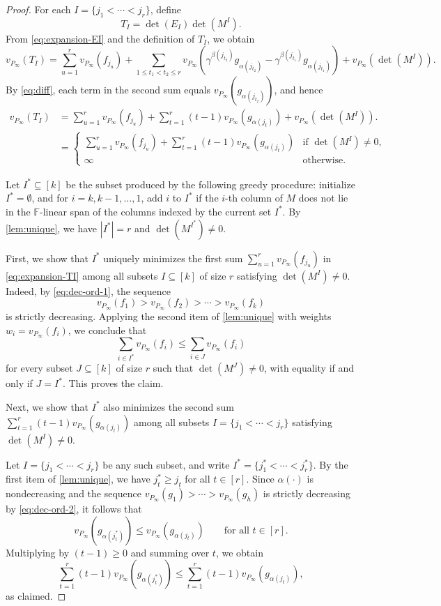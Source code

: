 \documentclass[10pt,a4paper]{amsart}
\newcommand{\F}{\mathbb{F}}
\begin{document}
\begin{proof}
\medskip
For each $I=\{j_1<\cdots<j_r\}$, define
\[
T_I=\det(E_I)\det(M^I).
\]
From \eqref{eq:expansion-EI} and the definition of $T_I$, we obtain
\[
v_{P_\infty}(T_I)
=
\sum_{u=1}^r v_{P_\infty}(f_{j_u})
+
\sum_{1\le t_1<t_2\le r}
v_{P_\infty}\!\left(
\gamma^{\beta(j_{t_2})} g_{\alpha(j_{t_2})}
-
\gamma^{\beta(j_{t_1})} g_{\alpha(j_{t_1})}
\right)
+
v_{P_\infty}(\det(M^I)).
\]
By \eqref{eq:diff}, each term in the second sum equals
$v_{P_\infty}(g_{\alpha(j_{t_2})})$, and hence
\begin{equation}\label{eq:expansion-TI}
\begin{aligned}
v_{P_\infty}(T_I)
&=
\sum_{u=1}^r v_{P_\infty}(f_{j_u})
+
\sum_{t=1}^r (t-1)v_{P_\infty}(g_{\alpha(j_t)})
+
v_{P_\infty}(\det(M^I)).\\
&=\begin{cases}
\sum_{u=1}^r v_{P_\infty}(f_{j_u})
+
\sum_{t=1}^r (t-1)v_{P_\infty}(g_{\alpha(j_t)}) & \text{if } \det(M^I)\neq 0,\\
\infty & \text{otherwise.}
\end{cases}
\end{aligned}
\end{equation}

Let $I^*\subseteq [k]$ be the subset produced by the following greedy procedure:
initialize $I^*=\emptyset$, and for $i=k,k-1,\dots,1$, add $i$ to $I^*$ if the $i$-th column of $M$ does not lie in the $\F$-linear span of the columns indexed by the current set $I^*$.
By \cref{lem:unique}, we have $|I^*|=r$ and $\det(M^{I^*})\neq 0$.

First, we show that $I^*$ uniquely minimizes
the first sum $\sum_{u=1}^r v_{P_\infty}(f_{j_u})$ in \eqref{eq:expansion-TI}
among all subsets $I\subseteq [k]$ of size $r$ satisfying $\det(M^I)\neq 0$.
Indeed, by \eqref{eq:dec-ord-1}, the sequence
\[
v_{P_\infty}(f_1) > v_{P_\infty}(f_2) > \cdots > v_{P_\infty}(f_k)
\]
is strictly decreasing. Applying the second item of \cref{lem:unique} with weights $w_i = v_{P_\infty}(f_i)$, we conclude that
\[
\sum_{i\in I^*} v_{P_\infty}(f_i)
\le \sum_{i\in J} v_{P_\infty}(f_i)
\]
for every subset $J\subseteq [k]$ of size $r$ such that $\det(M^J)\neq 0$, with equality if and only if $J=I^*$. This proves the claim.
 

Next, we show that $I^*$ also minimizes the second sum $\sum_{t=1}^r (t-1)v_{P_\infty}(g_{\alpha(j_t)})$
among all subsets $I=\{j_1<\cdots<j_r\}$ satisfying $\det(M^I)\neq 0$.

Let $I=\{j_1<\cdots<j_r\}$ be any such subset, and write $I^*=\{j_1^*<\cdots<j_r^*\}$.
By the first item of \cref{lem:unique}, we have $j_t^*\ge j_t$ for all $t\in [r]$.
Since $\alpha(\cdot)$ is nondecreasing and the sequence
$v_{P_\infty}(g_1) > \cdots > v_{P_\infty}(g_h)$
is strictly decreasing by \eqref{eq:dec-ord-2}, it follows that
\[
v_{P_\infty}(g_{\alpha(j_t^*)})
\le
v_{P_\infty}(g_{\alpha(j_t)})
\qquad\text{for all } t\in [r].
\]
Multiplying by $(t-1)\ge 0$ and summing over $t$, we obtain
\[
\sum_{t=1}^r (t-1)v_{P_\infty}(g_{\alpha(j_t^*)})
\le
\sum_{t=1}^r (t-1)v_{P_\infty}(g_{\alpha(j_t)}),
\]
as claimed.


\end{proof}
\end{document}
